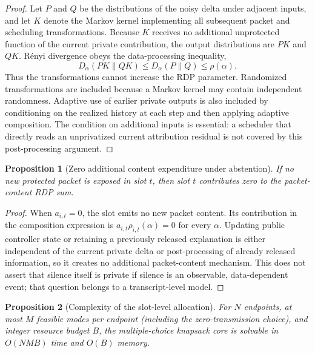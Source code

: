 \documentclass[10pt,conference]{IEEEtran}
\newtheorem{proposition}{Proposition}
\begin{document}
\begin{proof}
Let $P$ and $Q$ be the distributions of the noisy delta under adjacent inputs,
and let $K$ denote the Markov kernel implementing all subsequent packet and
scheduling transformations. Because $K$ receives no additional unprotected
function of the current private contribution, the output distributions are
$PK$ and $QK$. R\'enyi divergence obeys the data-processing inequality,
\begin{equation}
D_\alpha(PK\|QK)\leq D_\alpha(P\|Q)\leq\rho(\alpha).
\end{equation}
Thus the transformations cannot increase the RDP parameter. Randomized
transformations are included because a Markov kernel may contain independent
randomness. Adaptive use of earlier private outputs is also included by
conditioning on the realized history at each step and then applying adaptive
composition. The condition on additional inputs is essential: a scheduler
that directly reads an unprivatized current attribution residual is not
covered by this post-processing argument.
\end{proof}

\begin{proposition}[Zero additional content expenditure under abstention]
If no new protected packet is exposed in slot $t$, then slot $t$ contributes
zero to the packet-content RDP sum.
\end{proposition}

\begin{proof}
When $a_{i,t}=0$, the slot emits no new packet content. Its contribution in the
composition expression is
$a_{i,t}\rho_{i,t}(\alpha)=0$ for every $\alpha$. Updating public controller
state or retaining a previously released explanation is either independent of
the current private delta or post-processing of already released information,
so it creates no additional packet-content mechanism. This does not assert
that silence itself is private if silence is an observable, data-dependent
event; that question belongs to a transcript-level model.
\end{proof}

\begin{proposition}[Complexity of the slot-level allocation]
For $N$ endpoints, at most $M$ feasible modes per endpoint (including the
zero-transmission choice), and integer resource budget $B$, the
multiple-choice knapsack core is solvable in $O(NMB)$ time and $O(B)$ memory.
\end{proposition}
\end{document}
